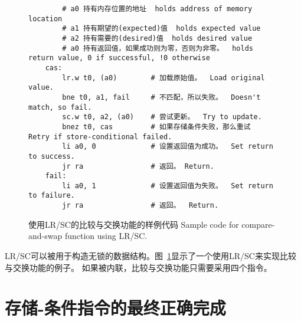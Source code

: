 \begin{figure}[h!]
\begin{center}
\begin{verbatim}
        # a0 持有内存位置的地址  holds address of memory location
        # a1 持有期望的(expected)值  holds expected value
        # a2 持有需要的(desired)值  holds desired value
        # a0 持有返回值，如果成功则为零，否则为非零。  holds return value, 0 if successful, !0 otherwise
    cas:
        lr.w t0, (a0)        # 加载原始值。  Load original value.
        bne t0, a1, fail     # 不匹配，所以失败。  Doesn't match, so fail.
        sc.w t0, a2, (a0)    # 尝试更新。  Try to update.
        bnez t0, cas         # 如果存储条件失败，那么重试  Retry if store-conditional failed.
        li a0, 0             # 设置返回值为成功。  Set return to success.
        jr ra                # 返回。 Return.
    fail:
        li a0, 1             # 设置返回值为失败。  Set return to failure.
        jr ra                # 返回。  Return.
\end{verbatim}
\end{center}
\caption{使用LR/SC的比较与交换功能的样例代码  Sample code for compare-and-swap function using LR/SC.}
\label{cas}
\end{figure}

LR/SC可以被用于构造无锁的数据结构。图~\ref{cas}显示了一个使用LR/SC来实现比较与交换功能的例子。
如果被内联，比较与交换功能只需要采用四个指令。

\section{存储-条件指令的最终正确完成}
\label{sec:lrscseq}

